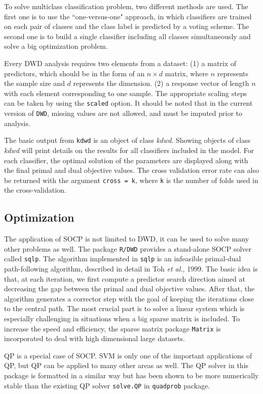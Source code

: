 \documentclass{bioinfo}
\begin{document}
To solve multiclass classification problem, two different methods are
used. The first one is to use the ``one-versus-one" approach, in which
classifiers are trained on each pair of classes and the class label is
predicted by a voting scheme. The second one is to build a single
classifier including all classes simultaneously and solve a big
optimization problem.

Every DWD analysis requires two elements from a dataset: (1) a matrix
of predictors, which should be in the form of an $n \times d$ matrix,
where $n$ represents the sample size and $d$ represents the
dimension. (2) a response vector of length $n$ with each element
corresponding to one sample. The appropriate scaling steps can be
taken by using the \texttt{scaled} option. It should be noted that in
the current version of \texttt{DWD}, missing values are not allowed,
and must be imputed prior to analysis.

The basic output from \texttt{kdwd} is an object of class {\em
  kdwd}. Showing objects of class {\em kdwd} will print details on the
results for all classifiers included in the model. For each
classifier, the optimal solution of the parameters are displayed along
with the final primal and dual objective values.  The cross validation
error rate can also be returned with the argument \texttt{cross = k},
where \texttt{k} is the number of folds used in the cross-validation.

\subsection{Optimization}
The application of SOCP is not limited to DWD, it can be used to solve
many other problems as well. The package \texttt{R/DWD} provides a
stand-alone SOCP solver called \texttt{sqlp}. The algorithm
implemented in \texttt{sqlp} is an infeasible primal-dual
path-following algorithm, described in detail in Toh {\em et al.},
1999. The basic idea is that, at each iteration, we first compute a
predictor search direction aimed at decreasing the gap between the
primal and dual objective values. After that, the algorithm generates
a corrector step with the goal of keeping the iterations close to the
central path. The most crucial part is to solve a linear system which
is especially challenging in situations when a big sparse matrix is
included. To increase the speed and efficiency, the sparse matrix
package \texttt{Matrix} is incorporated to deal with high dimensional
large datasets.

QP is a special case of SOCP. SVM is only one of the important
applications of QP, but QP can be applied to many other areas as
well. The QP solver in this package is formatted in a similar way but
has been shown to be more numerically stable than the existing QP
solver \texttt{solve.QP} in \texttt{quadprob} package.
\end{document}
